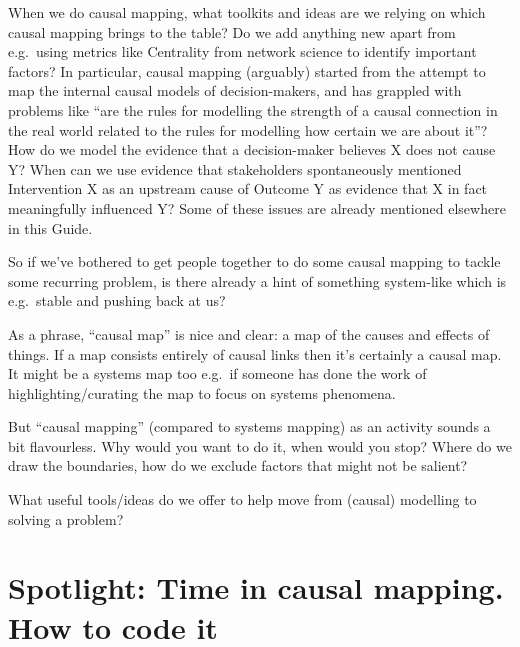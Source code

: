\documentclass[
]{book}
\begin{document}
When we do causal mapping, what toolkits and ideas are we relying on which causal mapping brings to the table? Do we add anything new apart from e.g.~using metrics like Centrality from network science to identify important factors? In particular, causal mapping (arguably) started from the attempt to map the internal causal models of decision-makers, and has grappled with problems like ``are the rules for modelling the strength of a causal connection in the real world related to the rules for modelling how certain we are about it''? How do we model the evidence that a decision-maker believes X does not cause Y? When can we use evidence that stakeholders spontaneously mentioned Intervention X as an upstream cause of Outcome Y as evidence that X in fact meaningfully influenced Y? Some of these issues are already mentioned elsewhere in this Guide.

So if we've bothered to get people together to do some causal mapping to tackle some recurring problem, is there already a hint of something system-like which is e.g.~stable and pushing back at us?

As a phrase, ``causal map'' is nice and clear: a map of the causes and effects of things. If a map consists entirely of causal links then it's certainly a causal map. It might be a systems map too e.g.~if someone has done the work of highlighting/curating the map to focus on systems phenomena.

But ``causal mapping'' (compared to systems mapping) as an activity sounds a bit flavourless. Why would you want to do it, when would you stop? Where do we draw the boundaries, how do we exclude factors that might not be salient?

What useful tools/ideas do we offer to help move from (causal) modelling to solving a problem?

\hypertarget{spotlight-time-in-causal-mapping.-how-to-code-it}{%
\chapter{Spotlight: Time in causal mapping. How to code it}\label{spotlight-time-in-causal-mapping.-how-to-code-it}}
\end{document}
